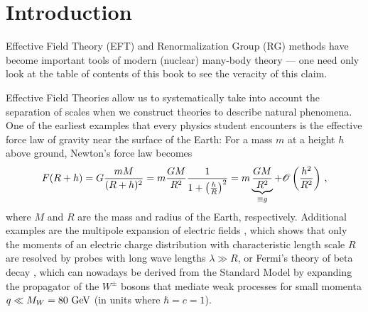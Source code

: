 {\section{Introduction}
Effective Field Theory (EFT) and Renormalization Group (RG) methods
have become important tools of modern (nuclear) many-body theory ---
one need only look at the table of contents of this book to see the
veracity of this claim.

Effective Field Theories allow us to systematically take into account the separation of
scales when we construct theories to describe natural phenomena. One
of the earliest examples that every physics student encounters is the 
effective force law of gravity near the surface of the Earth: For a
mass $m$ at a height $h$ above ground, Newton's force law becomes
\begin{equation}
  F(R+h) = G\frac{m M}{(R+h)^2} = m \frac{GM}{R^2} \frac{1}{1+\left(\frac{h}{R}\right)^2}
  =m \underbrace{\frac{GM}{R^2}}_{\equiv g} + \mathcal{O}\left(\frac{h^2}{R^2}\right)\,,
\end{equation}
where $M$ and $R$ are the mass and radius of the Earth, respectively.
Additional examples are the multipole expansion of electric fields 
\cite{Jackson:1999yg}, which shows that only the moments of an electric
charge distribution with characteristic length scale $R$ are resolved
by probes with long wave lengths $\lambda\gg R$, or Fermi's theory of 
beta decay \cite{Fermi:1934eu}, which can nowadays be derived from the
Standard Model by expanding the propagator of the $W^\pm$ bosons that
mediate weak processes for small momenta $q\ll M_W=80\,\,\text{GeV}$ (in units
where $\hbar=c=1$).

}
